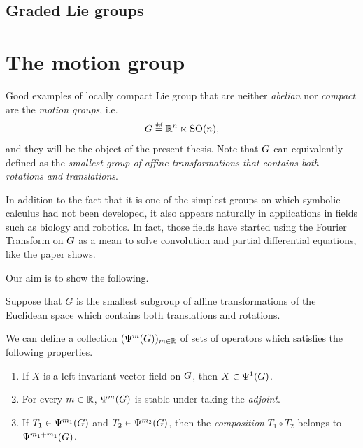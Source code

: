 \subsection{Graded Lie groups}

\section{The motion group}

Good examples of locally compact Lie group that are neither \emph{abelian} nor \emph{compact} are the \emph{motion groups}, i.e.
\begin{align*}
    \Group \defeq \R^n \ltimes \SpecialOrthogonalGroup n,
\end{align*}
and they will be the object of the present thesis.
Note that $G$ can equivalently defined as the \emph{smallest group of affine transformations that contains both rotations and translations}.

In addition to the fact that it is one of the simplest groups on which symbolic calculus had not been developed,
it also appears naturally in applications in fields such as biology and robotics.
In fact, those fields have started using the Fourier Transform on $G$ as a mean to solve convolution and partial differential equations,
like the paper \cite{ChirikjianKyatkin00} shows.

Our aim is to show the following.

\begin{theorem}
    Suppose that $G$ is the smallest subgroup of affine transformations of the Euclidean space
    which contains both translations and rotations.

    We can define a collection $(\Psi^{m}_{}(G))_{m \in \mathbb{R}}$
    of sets of operators
    which satisfies the following properties.
    \begin{enumerate}
        \item If $X$ is a left-invariant vector field on $G$,
            then $X \in \Psi^{1}_{}(G)$.
        \item For every $m \in \mathbb{R}$, $\Psi^{m}_{}(G)$ is stable under taking the \emph{adjoint}.
        \item If $T_1 \in \Psi^{m_1}_{}(G)$ and $T_2 \in \Psi^{m_2}_{}(G)$, then the \emph{composition} $T_1 \circ T_2$ belongs to $\Psi^{m_1 + m_1}_{}(G)$.
    \end{enumerate}
\end{theorem}

